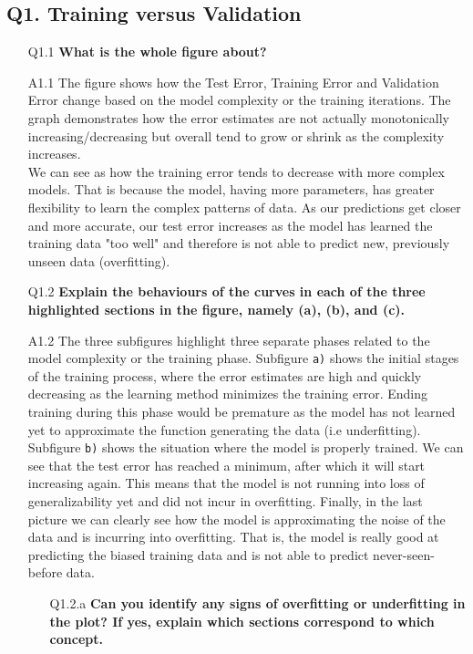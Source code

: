 \documentclass[tikz,14pt,fleqn]{article}
\begin{document}
\subsection{Q1. Training versus Validation}
\begin{itemize}
\item[Q1.1] \textbf{What is the whole figure about?}
\item[A1.1] The figure shows how the Test Error, Training Error and Validation Error change based on the model complexity or the training iterations. The graph demonstrates how the error estimates are not actually monotonically increasing/decreasing but overall tend to grow or shrink as the complexity increases.\\
We can see as how the training error tends to decrease with more complex models. That is because the model, having more parameters, has greater flexibility to learn the complex patterns of data. As our predictions get closer and more accurate, our test error increases as the model has learned the training data "too well" and therefore is not able to predict new, previously unseen data (overfitting).
\item[Q1.2] \textbf{Explain the behaviours of the curves in each of the three highlighted sections in the figure, namely (a), (b), and (c).}   
\item[A1.2] The three subfigures highlight three separate phases related to the model complexity or the training phase. Subfigure \verb|a)| shows the initial stages of the training process, where the error estimates are high and quickly decreasing as the learning method minimizes the training error. Ending training during this phase would be premature as the model has not learned yet to approximate the function generating the data (i.e underfitting). Subfigure \verb|b)| shows the situation where the model is properly trained. We can see that the test error has reached a minimum, after which it will start increasing again. This means that the model is not running into loss of generalizability yet and did not incur in overfitting. %
Finally, in the last picture we can clearly see how the model is approximating the noise of the data and is incurring into overfitting. That is, the model is really good at predicting the biased training data and is not able to predict never-seen-before data.
\begin{itemize}
\item[Q1.2.a] \textbf{Can you identify any signs of overfitting or underfitting in the plot? If yes, explain which sections correspond to which concept.}

\end{itemize}
\end{itemize}
\end{document}
